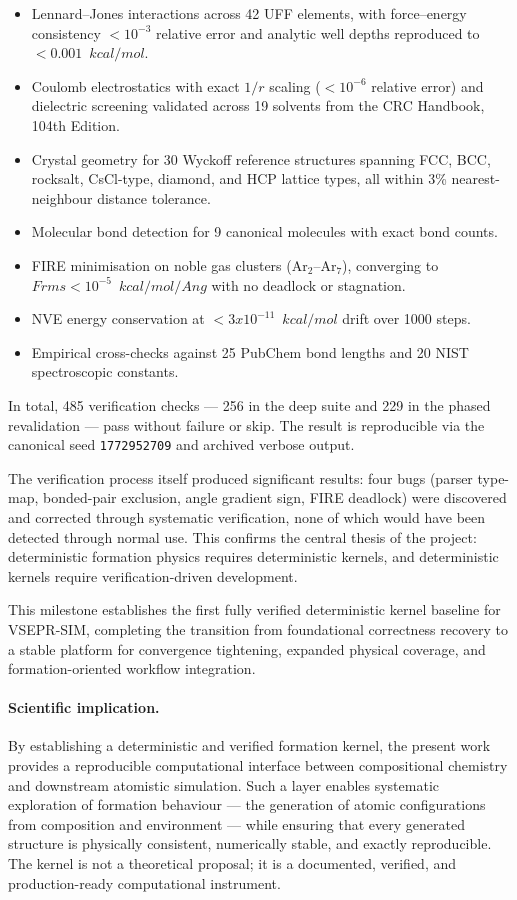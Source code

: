 \documentclass[11pt,twoside]{article}
\def\AA{Ang}%
\def\times{x}%
\def\kcalmol{kcal/mol}%
\def\Angstrom{Ang}%
\def\Frms{Frms}%
\newcommand{\Angstrom}{\text{\AA}}
\newcommand{\kcalmol}{\text{kcal/mol}}
\newcommand{\Frms}{F_{\mathrm{rms}}}
\begin{document}
\begin{itemize}
  \item Lennard--Jones interactions across 42 UFF elements, with force--energy consistency $< 10^{-3}$ relative error and analytic well depths reproduced to $< 0.001$~$\kcalmol$.
  \item Coulomb electrostatics with exact $1/r$ scaling ($< 10^{-6}$ relative error) and dielectric screening validated across 19 solvents from the CRC Handbook, 104th Edition.
  \item Crystal geometry for 30 Wyckoff reference structures spanning FCC, BCC, rocksalt, CsCl-type, diamond, and HCP lattice types, all within 3\% nearest-neighbour distance tolerance.
  \item Molecular bond detection for 9 canonical molecules with exact bond counts.
  \item FIRE minimisation on noble gas clusters (Ar$_2$--Ar$_7$), converging to $\Frms < 10^{-5}$~$\kcalmol/\Angstrom$ with no deadlock or stagnation.
  \item NVE energy conservation at $< 3 \times 10^{-11}$~$\kcalmol$ drift over 1000 steps.
  \item Empirical cross-checks against 25 PubChem bond lengths and 20 NIST spectroscopic constants.
\end{itemize}

In total, 485 verification checks --- 256 in the deep suite and 229 in the phased revalidation --- pass without failure or skip. The result is reproducible via the canonical seed \texttt{1772952709} and archived verbose output.

The verification process itself produced significant results: four bugs (parser type-map, bonded-pair exclusion, angle gradient sign, FIRE deadlock) were discovered and corrected through systematic verification, none of which would have been detected through normal use. This confirms the central thesis of the project: deterministic formation physics requires deterministic kernels, and deterministic kernels require verification-driven development.

This milestone establishes the first fully verified deterministic kernel baseline for VSEPR-SIM, completing the transition from foundational correctness recovery to a stable platform for convergence tightening, expanded physical coverage, and formation-oriented workflow integration.

\paragraph{Scientific implication.}
By establishing a deterministic and verified formation kernel, the present work provides a reproducible computational interface between compositional chemistry and downstream atomistic simulation. Such a layer enables systematic exploration of formation behaviour --- the generation of atomic configurations from composition and environment --- while ensuring that every generated structure is physically consistent, numerically stable, and exactly reproducible. The kernel is not a theoretical proposal; it is a documented, verified, and production-ready computational instrument.
\end{document}
